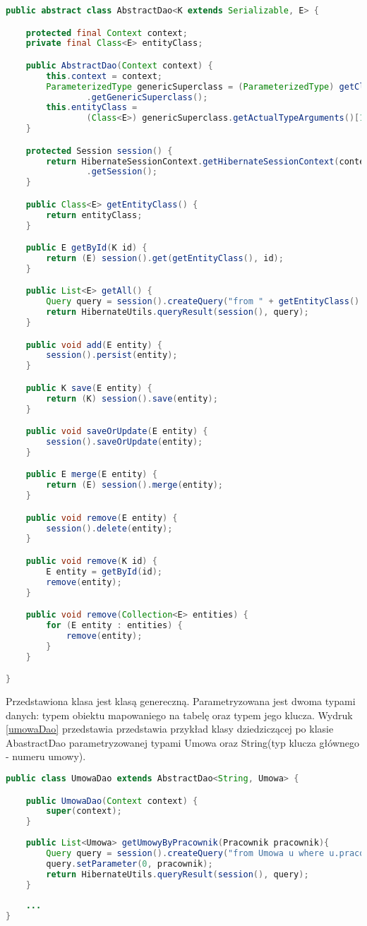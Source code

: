 \begin{lstlisting}[language=Java,style=outcode,showstringspaces=false,caption=Abstrakcyjna klasa DAO,label={abstractDao}]
public abstract class AbstractDao<K extends Serializable, E> {

	protected final Context context;
	private final Class<E> entityClass;

	public AbstractDao(Context context) {
		this.context = context;
		ParameterizedType genericSuperclass = (ParameterizedType) getClass()
				.getGenericSuperclass();
		this.entityClass = 
				(Class<E>) genericSuperclass.getActualTypeArguments()[1];
	}

	protected Session session() {
		return HibernateSessionContext.getHibernateSessionContext(context)
				.getSession();
	}

	public Class<E> getEntityClass() {
		return entityClass;
	}

	public E getById(K id) {
		return (E) session().get(getEntityClass(), id);
	}

	public List<E> getAll() {
		Query query = session().createQuery("from " + getEntityClass().getName());
		return HibernateUtils.queryResult(session(), query);
	}

	public void add(E entity) {
		session().persist(entity);
	}

	public K save(E entity) {
		return (K) session().save(entity);
	}

	public void saveOrUpdate(E entity) {
		session().saveOrUpdate(entity);
	}

	public E merge(E entity) {
		return (E) session().merge(entity);
	}

	public void remove(E entity) {
		session().delete(entity);
	}

	public void remove(K id) {
		E entity = getById(id);
		remove(entity);
	}

	public void remove(Collection<E> entities) {
		for (E entity : entities) {
			remove(entity);
		}
	}

}
\end{lstlisting}

Przedstawiona klasa jest klasą genereczną. Parametryzowana jest dwoma typami danych: typem obiektu mapowaniego na tabelę oraz typem jego klucza. Wydruk \ref{umowaDao} przedstawia przedstawia przykład klasy dziedziczącej po klasie AbastractDao parametryzowanej typami Umowa oraz String(typ klucza głównego - numeru umowy).

\begin{lstlisting}[language=Java,style=outcode,showstringspaces=false,caption=Klasa dao służąca do operacji na umowach,label={umowaDao}]
public class UmowaDao extends AbstractDao<String, Umowa> {

	public UmowaDao(Context context) {
		super(context);
	}
	
	public List<Umowa> getUmowyByPracownik(Pracownik pracownik){
		Query query = session().createQuery("from Umowa u where u.pracownik=?");
		query.setParameter(0, pracownik);
		return HibernateUtils.queryResult(session(), query);
	}
	
	...
}
\end{lstlisting}


